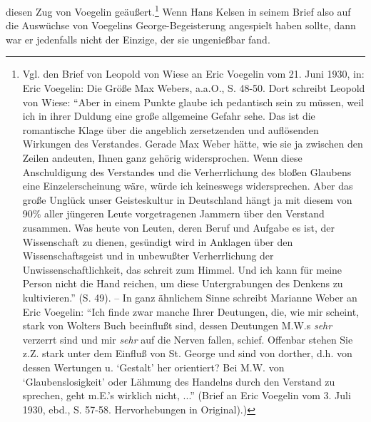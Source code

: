 \documentclass[12pt,a4paper,ngerman]{article}
\begin{document}
diesen Zug von Voegelin geäußert.\footnote{Vgl.  den Brief von Leopold von
  Wiese an Eric Voegelin vom 21. Juni 1930, in: Eric Voegelin: Die Größe Max
  Webers, a.a.O., S. 48-50. Dort schreibt Leopold von Wiese: "`Aber in einem
  Punkte glaube ich pedantisch sein zu müssen, weil ich in ihrer Duldung eine
  große allgemeine Gefahr sehe. Das ist die romantische Klage über die
  angeblich zersetzenden und auflösenden Wirkungen des Verstandes. Gerade Max
  Weber hätte, wie sie ja zwischen den Zeilen andeuten, Ihnen ganz gehörig
  widersprochen. Wenn diese Anschuldigung des Verstandes und die
  Verherrlichung des bloßen Glaubens eine Einzelerscheinung wäre, würde ich
  keineswegs widersprechen. Aber das große Unglück unser Geisteskultur in
  Deutschland hängt ja mit diesem von 90\% aller jüngeren Leute vorgetragenen
  Jammern über den Verstand zusammen. Was heute von Leuten, deren Beruf und
  Aufgabe es ist, der Wissenschaft zu dienen, gesündigt wird in Anklagen über
  den Wissenschaftsgeist und in unbewußter Verherrlichung der
  Unwissenschaftlichkeit, das schreit zum Himmel. Und ich kann für meine
  Person nicht die Hand reichen, um diese Untergrabungen des Denkens zu
  kultivieren."' (S.  49). -- In ganz ähnlichem Sinne schreibt Marianne Weber
  an Eric Voegelin: "`Ich finde zwar manche Ihrer Deutungen, die, wie mir
  scheint, stark von Wolters Buch beeinflußt sind, dessen Deutungen M.W.s {\em
    sehr} verzerrt sind und mir {\em sehr} auf die Nerven fallen, schief.
  Offenbar stehen Sie z.Z.  stark unter dem Einfluß von St.  George und sind
  von dorther, d.h.  von dessen Wertungen u. `Gestalt' her orientiert? Bei
  M.W. von `Glaubenslosigkeit' oder Lähmung des Handelns durch den Verstand zu
  sprechen, geht m.E.'s wirklich nicht, ..."' (Brief an Eric Voegelin vom 3.
  Juli 1930, ebd., S. 57-58.  Hervorhebungen in Original).)}  Wenn Hans Kelsen
in seinem Brief also auf die Auswüchse von Voegelins George-Begeisterung
angespielt haben sollte, dann war er jedenfalls nicht der Einzige, der sie
ungenießbar fand.
\end{document}
